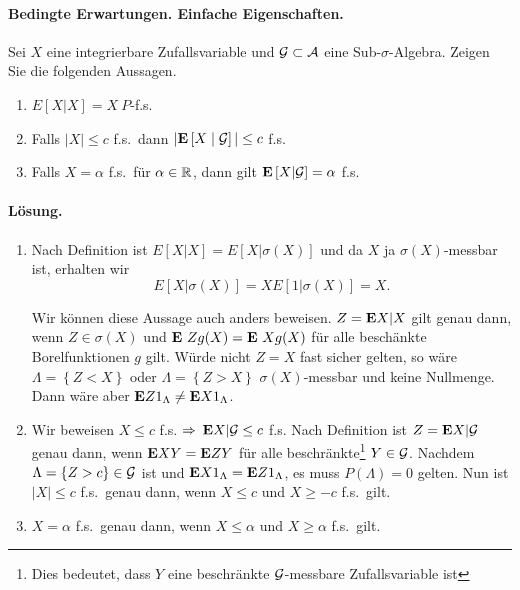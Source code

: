 \paragraph{Bedingte Erwartungen. Einfache Eigenschaften.} Sei $X$ eine
integrierbare Zufallsvariable und $\mathcal G \subset \mathcal A$ eine Sub-$\sigma$-Algebra.
Zeigen Sie die folgenden Aussagen.
\begin{enumerate}
    \item $E\left[ X|X \right] = X \ P$-f.s.
    \item Falls $| X| \leq c$ f.s.\, dann $| \mathbf{E} \left[ X \;\middle\vert\; \mathcal G \right] | \leq c$ f.s.
    \item Falls $X=\alpha$ f.s.\ für $\alpha\in\mathbb R$, dann gilt 
        $\mathbf{E} \left[ X | \mathcal G  \right]= \alpha $ f.s.
\end{enumerate}


\paragraph*{Lösung.} 
\begin{enumerate}
    \item 
        Nach Definition ist $E\left[ X| X \right]=E\left[ X|\sigma\left( X
        \right) \right]$ und da $X$ ja $\sigma\left( X \right)$-messbar ist,
        erhalten wir \begin{equation*} E\left[ X|\sigma\left( X \right)
            \right]= X E\left[ 1 | \sigma\left( X \right) \right] =X.
        \end{equation*}

        Wir können diese Aussage auch anders beweisen. $Z= \mathbf{E} X | X$ gilt genau
        dann, wenn $Z \in \sigma(X)$ und $\mathbf{E}\ Z g(X) = \mathbf{E}\ X g(X)$ für alle
        beschänkte Borelfunktionen $g$ gilt.  Würde nicht $Z = X$ fast sicher
        gelten, so wäre $\Lambda=\left\{ Z< X \right\}$ oder $\Lambda= \left\{
        Z > X \right\}$ $\sigma(X)$-messbar und keine Nullmenge. Dann wäre aber
        $\mathbf{E} Z 1_{\Lambda} \neq \mathbf{E} X 1_{\Lambda}$.
    \item Wir beweisen $X \leq c$ f.s. $\Rightarrow$ $ \mathbf{E} X | \mathcal G \leq c$ f.s. Nach
        Definition ist $Z=\mathbf{E} X|\mathcal G$ genau dann, wenn $\mathbf{E} X Y = \mathbf{E} Z Y$ für alle
        beschränkte\footnote{Dies bedeutet, dass $Y$ eine beschränkte
        $\mathcal G$-messbare Zufallsvariable ist} $Y\in \mathcal G$. Nachdem $\Lambda =
        \left\{ Z>c \right\} \in \mathcal G$ ist und $\mathbf{E} X 1_\Lambda = \mathbf{E} Z
        1_\Lambda$, es muss $P\left( \Lambda \right)=0$ gelten.  Nun ist $| X |
        \leq c$ f.s.\ genau dann, wenn $X \leq c$ und $ X \geq -c$ f.s.\ gilt.
    \item $X=\alpha$ f.s.\ genau dann, wenn $X \leq \alpha$ und $ X \geq
        \alpha$ f.s.\ gilt.
\end{enumerate}




